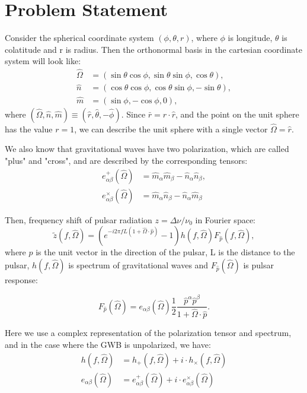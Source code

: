 \section{Problem Statement}

Consider the spherical coordinate system $(\phi, \theta, r)$, where $\phi$ is longitude, $\theta$ is colatitude and r is radius. Then the orthonormal basis in the cartesian coordinate system will look like:
\begin{align}
    \hat{\Omega} &= \left(\sin \theta \cos \phi, \sin \theta \sin \phi, \cos \theta \right), \\
    \hat{n} &= (\cos \theta \cos \phi, \cos \theta \sin \phi, - \sin \theta), \\
    \hat{m} &= (\sin \phi, - \cos \phi, 0),
\end{align}
where $(\hat{\Omega}, \hat{n}, \hat{m}) \equiv (\hat{r}, \hat{\theta}, -\hat{\phi})$. Since $\bar{r} = r \cdot \hat{r}$, and the point on the unit sphere has the value $r = 1$, we can describe the unit sphere with a single vector $\hat{\Omega} = \hat{r}$.

We also know that gravitational waves have two polarization, which are called "plus" and "cross", and are described by the corresponding tensors:
\begin{align}
    e^+_{\alpha \beta}(\hat{\Omega}) &= \hat{m}_{\alpha} \hat{m}_{\beta} - \hat{n}_{\alpha} \hat{n}_{\beta}, \\
    e^{\times}_{\alpha \beta}(\hat{\Omega}) &= \hat{m}_{\alpha} \hat{n}_{\beta} - \hat{n}_{\alpha} \hat{m}_{\beta}
\end{align}

Then, frequency shift of pulsar radiation $z = \Delta \nu/\nu_0$ in Fourier space:
\begin{equation}
    \tilde{z}(f, \hat{\Omega}) = \left( e^{- i 2 \pi f L (1 + \hat{\Omega} \cdot \hat{p})} - 1\right) h(f, \hat{\Omega}) F_{\hat{p}}(f, \hat{\Omega}),
\end{equation}
where $\hat{p}$ is the unit vector in the direction of the pulsar, L is the distance to the pulsar, $h(f, \hat{\Omega})$ is spectrum of gravitational waves and $F_{\hat{p}}(\hat{\Omega})$ is pulsar response:

\begin{equation}
F_{\hat{p}}(\hat{\Omega}) = e_{\alpha \beta}(\hat{\Omega}) \frac{1}{2} \frac{\hat{p}^{\alpha} \hat{p}^{\beta}}{1 + \hat{\Omega} \cdot \hat{p}}.
\end{equation}

Here we use a complex representation of the polarization tensor and spectrum, and in the case where the GWB is unpolarized, we have:
\begin{align}
    h(f, \hat{\Omega}) &= h_{+}(f, \hat{\Omega}) + i \cdot h_{\times}(f, \hat{\Omega}) \\
    e_{\alpha \beta}(\hat{\Omega}) &= e^{+}_{\alpha \beta}(\hat{\Omega}) + i \cdot e^{\times}_{\alpha \beta}(\hat{\Omega})
\end{align}

